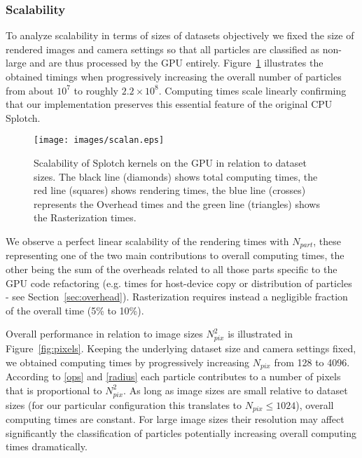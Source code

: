 \documentclass[1p]{elsarticle}
\begin{document}
\subsubsection{Scalability}
\label{sec:scalability}
To analyze scalability in terms of sizes of datasets objectively we fixed the size of rendered images and camera settings so that all particles are classified as non-large and are thus processed by the GPU entirely. 
Figure~\ref{fig:scalability} illustrates the obtained timings when progressively increasing the overall number of particles
from about $10^7$ to roughly $2.2\times 10^8$. Computing times scale linearly confirming that our implementation preserves this essential feature of the original CPU Splotch. 
\begin{figure}
\centering
\texttt{[image: images/scalan.eps]}
\caption{Scalability of Splotch kernels on the GPU in relation to dataset sizes. 
The black line (diamonds) shows total computing times, the red line (squares) shows rendering times, the blue line (crosses) represents the Overhead times and the green line (triangles) shows the Rasterization times.}
\label{fig:scalability}
\end{figure}


We observe a perfect linear scalability of the rendering times with $N_{part}$, 
these representing one of the two main contributions to overall computing times, 
the other being the sum of the overheads related to all those parts specific to the GPU code 
refactoring (e.g. times for host-device copy or distribution of particles - see Section~\ref{sec:overhead}). 
Rasterization requires instead a negligible fraction of the overall time (5\% to 10\%). 

Overall performance in relation to image sizes $N_{pix}^2$ is illustrated in Figure~\ref{fig:pixels}. Keeping the underlying dataset size and camera settings fixed, we obtained computing times by progressively increasing
$N_{pix}$ from 128 to 4096. According to \eqref{ops} and \eqref{radius} each particle contributes to a number of pixels that is proportional to $N_{pix}^{2}$. As long as image sizes are small relative to dataset sizes (for our particular configuration this translates to $N_{pix} \le 1024$), overall computing times are constant. For large image sizes their resolution may affect significantly the classification of particles potentially increasing overall computing times dramatically.
\end{document}
